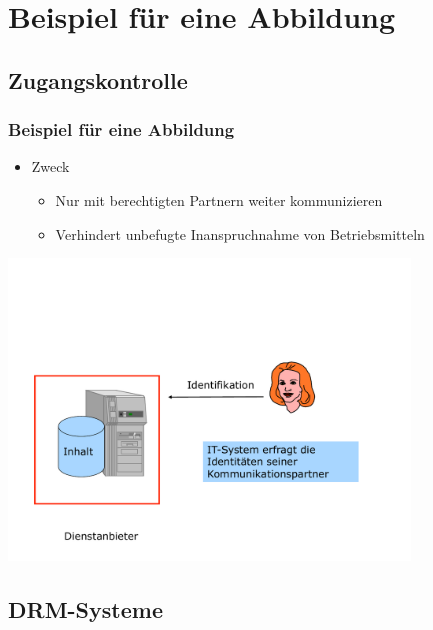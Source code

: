 \documentclass[t]{beamer}
\begin{document}
\section{Beispiel für eine Abbildung} %

\subsection{Zugangskontrolle} %
\begin{frame}
	\frametitle{Beispiel für eine Abbildung}
	\begin{itemize}
		\item Zweck
			\begin{itemize}
				\item Nur mit \alert{berechtigten Partnern} weiter kommunizieren
				\item Verhindert unbefugte Inanspruchnahme von Betriebsmitteln
			\end{itemize}
	\end{itemize}
	\vspace{\fill}
	\pause %
	\begin{center}
		\includegraphics[width=0.8\textwidth]{../pic/abbildung1.pdf}
	\end{center}
\end{frame}

\subsection{DRM-Systeme} %
\end{document}
